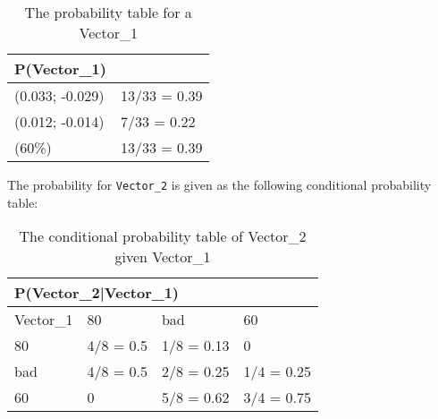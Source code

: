 \begin{center}
\begin{table}[H]
\label{Vector0_table}
\begin{tabular}{|l|l|}
\hline
P(Vector\_1) &\\ \hline
(0.033; -0.029) & 13/33 = 0.39   \\ \hline 
(0.012; -0.014) & 7/33 = 0.22  \\ \hline
(60\%)   & 13/33 = 0.39  \\ \hline
\end{tabular}
\caption{The probability table for a Vector\_1}
\end{table}
\end{center}

The probability for \texttt{Vector\_2} is given as the following conditional
probability table: 

\begin{table}[]
\centering
\label{vector2tab}
\begin{tabular}{|l|l|l|l|}
\hline
\multicolumn{4}{|l|}{P(Vector\_2|Vector\_1)} \\ \hline
 Vector\_1 & 80    & bad    & 60    \\ \hline
 80    & 4/8 = 0.5    & 1/8 = 0.13    & 0    \\ \hline
 bad   & 4/8 = 0.5    & 2/8 = 0.25    & 1/4 = 0.25  \\ \hline
 60    & 0            & 5/8 = 0.62    & 3/4 = 0.75  \\ \hline
\end{tabular}
\caption{The conditional probability table of Vector\_2 given Vector\_1}
\end{table}



